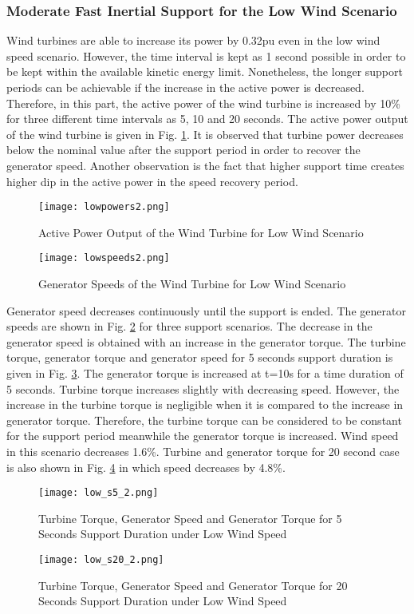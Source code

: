 \subsubsection{Moderate Fast Inertial Support for the  Low Wind Scenario}
Wind turbines are able to increase its power by 0.32pu even in the low wind speed scenario. However, the time interval is kept as 1 second possible in order to be kept within the available kinetic energy limit. Nonetheless, the longer support periods can be achievable if the increase in the active power is decreased. Therefore, in this part, the active power of the wind turbine is increased by 10\% for three different time intervals as 5, 10 and 20 seconds. The active power output of the wind turbine is given in Fig. \ref{lowactivepowers}. It is observed that turbine power decreases below the nominal value after the support period in order to recover the generator speed. Another observation is the fact that higher support time creates higher dip in the active power in the speed recovery period.\par
\begin{figure}[h]
	\centering
	\texttt{[image: lowpowers2.png]}
	\caption{Active Power Output of the Wind Turbine for Low Wind Scenario}
	\label{lowactivepowers}
\end{figure}
\begin{figure}[h]
	\centering
	\texttt{[image: lowspeeds2.png]}
	\caption{Generator Speeds of the Wind Turbine for Low Wind Scenario}
	\label{low_speeds}
\end{figure}
Generator speed decreases continuously until the support is ended. The generator speeds are shown in Fig. \ref{low_speeds} for three support scenarios. The decrease in the generator speed is obtained with an increase in the generator torque. The turbine torque, generator torque and generator speed for 5 seconds support duration is given in Fig. \ref{low_torques}. The generator torque is increased at t=10s for a time duration of 5 seconds. Turbine torque increases slightly with decreasing speed. However, the increase in the turbine torque is negligible when it is compared to the increase in generator torque. Therefore, the turbine torque can be considered to be constant for the support period meanwhile the generator torque is increased. Wind speed in this scenario decreases 1.6\%. Turbine and generator torque for 20 second case is also shown in Fig. \ref{low_torques3} in which speed decreases by 4.8\%.\par
\begin{figure}[h!]
	\centering
	\texttt{[image: low\_s5\_2.png]}
	\caption{Turbine Torque, Generator Speed and Generator Torque for 5 Seconds Support Duration under Low Wind Speed}
	\label{low_torques}
\end{figure}
\begin{figure}[h!]
	\centering
	\texttt{[image: low\_s20\_2.png]}
	\caption{Turbine Torque, Generator Speed and Generator Torque for 20 Seconds Support Duration under Low Wind Speed}
	\label{low_torques3}
\end{figure}
